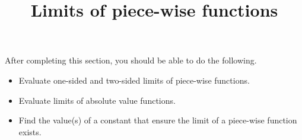 \documentclass{ximera}
\title{Limits of piece-wise functions}
\begin{document}
\begin{abstract}
\end{abstract}
\maketitle

\begin{sectionOutcomes}
After completing this section, you should be able to do the following. 

\begin{itemize}
\item Evaluate one-sided and two-sided limits of piece-wise functions.
\item Evaluate limits of absolute value functions. 
\item Find the value(s) of a constant that ensure the limit of a piece-wise function exists. 
\end{itemize}
\end{sectionOutcomes}
\end{document}
